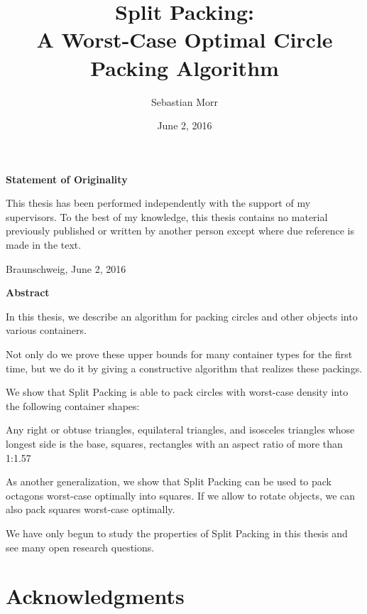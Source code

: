 \documentclass[a4paper,style=print,oneside,bibliography=totoc,nexus,lnum,extramargin]{tubsbook}
\title{Split Packing:\\ A Worst-Case Optimal Circle Packing Algorithm}
\author{\sffamily\LARGE Sebastian Morr}
\date{\large June 2, 2016}
\begin{document}
\frontmatter %

\maketitle
\cleardoublepage

\thispagestyle{plain} %
\vspace*{7cm}
\centerline{\bfseries Statement of Originality}
\vspace*{1em}
\noindent
This thesis has been performed independently with the support of my supervisors.
To the best of my knowledge, this thesis contains no material previously
published or written by another person except where due reference is made in the text.

\par
  \bigskip\noindent Braunschweig, June 2, 2016 \par
  \vspace*{10mm}
  \hfill\hrulefill
\cleardoublepage

\thispagestyle{plain} %
\centerline{\bfseries Abstract}
\vspace*{1em}
\noindent
In this thesis, we describe an algorithm for packing circles and other objects into various containers.

Not only do we prove these upper bounds for many container types for the first time, but we do it by giving a constructive algorithm that realizes these packings.

We show that Split Packing is able to pack circles with worst-case density into the following container shapes:

Any right or obtuse triangles,
equilateral triangles, and isosceles triangles whose longest side is the base,
squares,
rectangles with an aspect ratio of more than 1:1.57

As another generalization, we show that Split Packing can be used to pack octagons worst-case optimally into squares. If we allow to rotate objects, we can also pack squares worst-case optimally.

We have only begun to study the properties of Split Packing in this thesis and see many open research questions.

\cleardoublepage

\section*{Acknowledgments}
\end{document}
